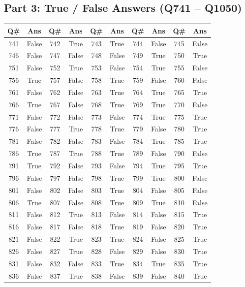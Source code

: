 \subsection*{Part 3: True / False Answers (Q741 -- Q1050)}
\small
\begin{longtable}{cc|cc|cc|cc|cc}
\toprule
\textbf{Q\#} & \textbf{Ans} & \textbf{Q\#} & \textbf{Ans} & \textbf{Q\#} & \textbf{Ans} & \textbf{Q\#} & \textbf{Ans} & \textbf{Q\#} & \textbf{Ans} \\
\midrule
\endhead
741 & False & 742 & True & 743 & True & 744 & False & 745 & False \\
746 & False & 747 & False & 748 & False & 749 & True & 750 & True \\
751 & False & 752 & True & 753 & False & 754 & True & 755 & False \\
756 & True & 757 & False & 758 & True & 759 & False & 760 & False \\
761 & False & 762 & False & 763 & True & 764 & True & 765 & True \\
766 & True & 767 & False & 768 & True & 769 & True & 770 & False \\
771 & False & 772 & False & 773 & False & 774 & True & 775 & True \\
776 & False & 777 & True & 778 & True & 779 & False & 780 & True \\
781 & False & 782 & False & 783 & False & 784 & True & 785 & True \\
786 & True & 787 & True & 788 & True & 789 & False & 790 & False \\
791 & True & 792 & False & 793 & False & 794 & True & 795 & True \\
796 & False & 797 & False & 798 & True & 799 & True & 800 & False \\
801 & False & 802 & False & 803 & True & 804 & False & 805 & False \\
806 & True & 807 & False & 808 & True & 809 & True & 810 & False \\
811 & False & 812 & True & 813 & False & 814 & False & 815 & True \\
816 & False & 817 & False & 818 & True & 819 & False & 820 & True \\
821 & False & 822 & True & 823 & True & 824 & False & 825 & True \\
826 & False & 827 & True & 828 & False & 829 & False & 830 & True \\
831 & False & 832 & False & 833 & True & 834 & True & 835 & True \\
836 & False & 837 & True & 838 & False & 839 & False & 840 & True \\

\end{longtable}
